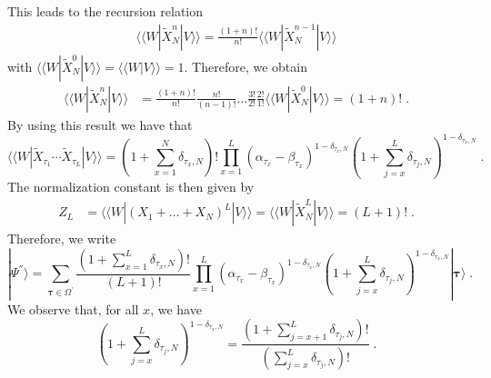 \documentclass[10pt]{article}
\numberwithin{equation}{section}
\numberwithin{equation}{subsection}
\newcommand{\dt}{\;.}
\begin{document}
This leads to the recursion relation
\begin{align}
		 \langle \langle W|  \widetilde{X}_{N}^{n} |V\rangle\rangle =\frac{(1+n)!}{n!} \langle \langle W|  \widetilde{X}_{N}^{n-1} |V\rangle\rangle 
\end{align}
with $	 \langle \langle W|  \widetilde{X}_{N}^{0} |V\rangle\rangle=	 \langle \langle W |V\rangle\rangle  =1$. 
Therefore, we obtain 
\begin{align}
	 \langle \langle W|  \widetilde{X}_{N}^{n} |V\rangle\rangle &=%
	\frac{(1+n)!}{n!}\frac{n!}{(n-1)!}\ldots \frac{3!}{2!}\frac{2!}{1!} \langle \langle W|  \widetilde{X}_{N}^{0} |V\rangle\rangle =
	(1+n)!\dt
\end{align}
By using this result we have that
\begin{equation}
	 \langle \langle W|  \widetilde{X}_{\tau_{1}}\cdots  \widetilde{X}_{\tau_{L}}
	|V\rangle\rangle=(1+{\textstyle \sum}_{x=1}^{N}\delta_{\tau_{x},N})!\prod_{x=1}^{L}\left(\alpha_{\tau_{x}}-\beta_{\tau_{x}}\right)^{1-\delta_{\tau_{x},N}}\left(1+\sum_{j=x}^{L}\delta_{\tau_{j},N}\right)^{1-\delta_{\tau_{x},N}}\dt
\end{equation}
The normalization constant is then given by
\begin{align}
	Z_{L}&= \langle \langle W|  (X_{1}+\ldots+X_{N})^{L} |V\rangle\rangle = \langle \langle W|  \widetilde{X}_{N}^{L}|V\rangle \rangle=
	(L+1)!\dt
\end{align}
Therefore, we write
\begin{equation}\label{resulEsteady}
	|\Psi^{''}\rangle= \sum_{\bm{\tau}\in \Omega^{'}}\frac{(1+\sum_{x=1}^{L}\delta_{\tau_{x},N})!}{(L+1)!}\prod_{x=1}^{L}\left(\alpha_{\tau_{x}}-\beta_{\tau_{x}}\right)^{1-\delta_{\tau_{x},N}}\left(1+\sum_{j=x}^{L}\delta_{\tau_{j},N}\right)^{1-\delta_{\tau_{x},N}}|\bm{\tau}\rangle\dt
\end{equation}
We observe that, for all $x$, we have
\begin{equation}
	\left(1+\textstyle\sum_{j=x}^{L}\delta_{\tau_{j},N}\right)^{1-\delta_{\tau_{x},N}}=\frac{(1+\sum_{j=x+1}^{L}\delta_{\tau_{j},N})!}{(\sum_{j=x}^{L}\delta_{\tau_{j},N})!}\dt
\end{equation}
\end{document}
